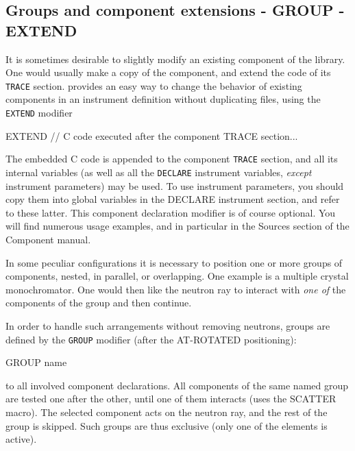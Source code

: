 \subsection{Groups and component extensions - GROUP - EXTEND}
\label{s:instrdefs-extend-group}

It is sometimes desirable to slightly modify an existing component of the \MCS library. One would usually make a copy of the component, and extend the code of its \texttt{TRACE} section. \MCS provides an easy way to change the behavior of existing components in an instrument definition without duplicating files, using the \texttt{EXTEND} modifier
\begin{mcstas}
EXTEND
// C code executed after the component TRACE section...
\end{mcstas} 
The embedded C code is appended to the
component \texttt{TRACE} section, and all its internal variables (as well as all
the \texttt{DECLARE} instrument variables, \emph{except} instrument parameters)
may be used. To use instrument parameters, you should copy them into global
variables in the DECLARE instrument section, and refer to these latter.  This
component declaration modifier is of course optional. You will find numerous
usage examples, and in particular in the Sources section of the Component
manual.

In some peculiar configurations it is necessary to position one or more groups
of components, nested, in parallel, or overlapping. One example is a multiple
crystal monochromator. One would then like the neutron ray to interact with
\emph{one of} the components of the group and then continue.

In order to handle such arrangements without removing neutrons, groups are
defined by the \texttt{GROUP} modifier (after the AT-ROTATED positioning):
\begin{mcstas}
GROUP name
\end{mcstas}
to all involved component declarations.
All components of
the same named group are tested one after the other, until one of them interacts
(uses the SCATTER macro). The selected component
acts on the neutron ray, and the rest of the group is skipped. Such groups are
thus exclusive (only one of the elements is active).

